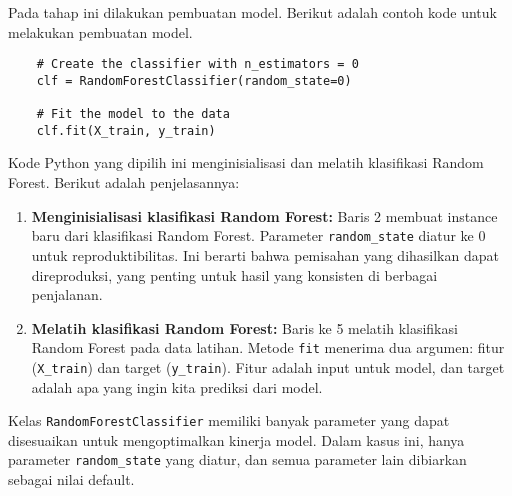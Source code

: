 Pada tahap ini dilakukan pembuatan model. Berikut adalah contoh kode untuk melakukan pembuatan model.
\begin{lstlisting}
    # Create the classifier with n_estimators = 0
    clf = RandomForestClassifier(random_state=0)

    # Fit the model to the data
    clf.fit(X_train, y_train)
\end{lstlisting}
    
Kode Python yang dipilih ini menginisialisasi dan melatih klasifikasi Random Forest. Berikut adalah penjelasannya:

\begin{enumerate}
\item \textbf{Menginisialisasi klasifikasi Random Forest:} Baris 
2 membuat instance baru dari klasifikasi Random Forest. Parameter \texttt{random\_state} diatur ke 0 untuk reproduktibilitas. Ini berarti bahwa pemisahan yang dihasilkan dapat direproduksi, yang penting untuk hasil yang konsisten di berbagai penjalanan.
\item \textbf{Melatih klasifikasi Random Forest:} Baris ke 5 melatih klasifikasi Random Forest pada data latihan. Metode \texttt{fit} menerima dua argumen: fitur (\texttt{X\_train}) dan target (\texttt{y\_train}). Fitur adalah input untuk model, dan target adalah apa yang ingin kita prediksi dari model.
\end{enumerate}

Kelas \texttt{RandomForestClassifier} memiliki banyak parameter yang dapat disesuaikan untuk mengoptimalkan kinerja model. Dalam kasus ini, hanya parameter \texttt{random\_state} yang diatur, dan semua parameter lain dibiarkan sebagai nilai default.
